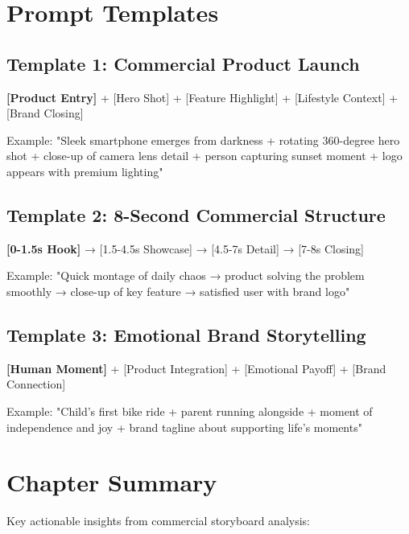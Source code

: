\section*{Prompt Templates}

\subsection*{Template 1: Commercial Product Launch}
\begin{Prompt}
\textbf{[Product Entry]} + [Hero Shot] + [Feature Highlight] + [Lifestyle Context] + [Brand Closing]

Example: "Sleek smartphone emerges from darkness + rotating 360-degree hero shot + close-up of camera lens detail + person capturing sunset moment + logo appears with premium lighting"
\end{Prompt}

\subsection*{Template 2: 8-Second Commercial Structure}
\begin{Prompt}
\textbf{[0-1.5s Hook]} → [1.5-4.5s Showcase] → [4.5-7s Detail] → [7-8s Closing]

Example: "Quick montage of daily chaos → product solving the problem smoothly → close-up of key feature → satisfied user with brand logo"
\end{Prompt}

\subsection*{Template 3: Emotional Brand Storytelling}
\begin{Prompt}
\textbf{[Human Moment]} + [Product Integration] + [Emotional Payoff] + [Brand Connection]

Example: "Child's first bike ride + parent running alongside + moment of independence and joy + brand tagline about supporting life's moments"
\end{Prompt}

\section*{Chapter Summary}

Key actionable insights from commercial storyboard analysis:

